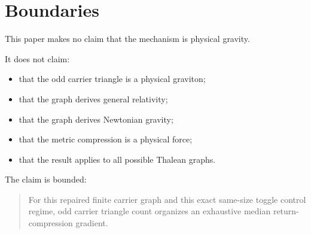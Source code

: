 \section{Boundaries}

This paper makes no claim that the mechanism is physical gravity.

It does not claim:
\begin{itemize}[leftmargin=2em]
\item that the odd carrier triangle is a physical graviton;
\item that the graph derives general relativity;
\item that the graph derives Newtonian gravity;
\item that the metric compression is a physical force;
\item that the result applies to all possible Thalean graphs.
\end{itemize}

The claim is bounded:

\begin{quote}
For this repaired finite carrier graph and this exact same-size toggle control regime, odd carrier triangle count organizes an exhaustive median return-compression gradient.
\end{quote}
